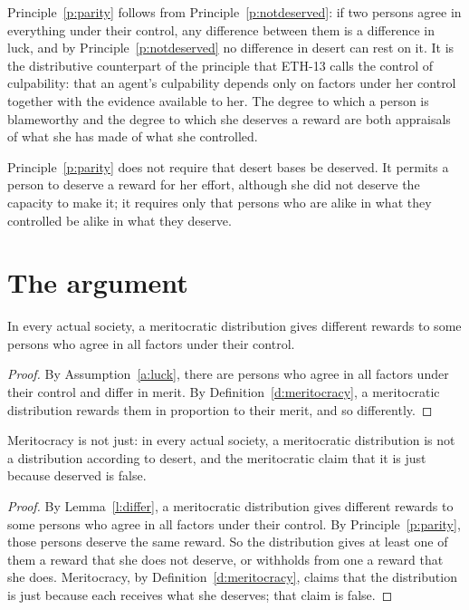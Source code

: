 \documentclass{situationist-preprint}
\begin{document}
Principle~\ref{p:parity} follows from Principle~\ref{p:notdeserved}: if two persons agree in everything under their control, any difference between them is a difference in luck, and by Principle~\ref{p:notdeserved} no difference in desert can rest on it. It is the distributive counterpart of the principle that ETH-13 calls the control of culpability: that an agent's culpability depends only on factors under her control together with the evidence available to her. The degree to which a person is blameworthy and the degree to which she deserves a reward are both appraisals of what she has made of what she controlled.

Principle~\ref{p:parity} does not require that desert bases be deserved. It permits a person to deserve a reward for her effort, although she did not deserve the capacity to make it; it requires only that persons who are alike in what they controlled be alike in what they deserve.

\section{The argument}

\begin{lemma}\label{l:differ}
In every actual society, a meritocratic distribution gives different rewards to some persons who agree in all factors under their control.
\end{lemma}

\begin{proof}
By Assumption~\ref{a:luck}, there are persons who agree in all factors under their control and differ in merit. By Definition~\ref{d:meritocracy}, a meritocratic distribution rewards them in proportion to their merit, and so differently.
\end{proof}

\begin{theorem}\label{t:unjust}
Meritocracy is not just: in every actual society, a meritocratic distribution is not a distribution according to desert, and the meritocratic claim that it is just because deserved is false.
\end{theorem}

\begin{proof}
By Lemma~\ref{l:differ}, a meritocratic distribution gives different rewards to some persons who agree in all factors under their control. By Principle~\ref{p:parity}, those persons deserve the same reward. So the distribution gives at least one of them a reward that she does not deserve, or withholds from one a reward that she does. Meritocracy, by Definition~\ref{d:meritocracy}, claims that the distribution is just because each receives what she deserves; that claim is false.
\end{proof}
\end{document}
